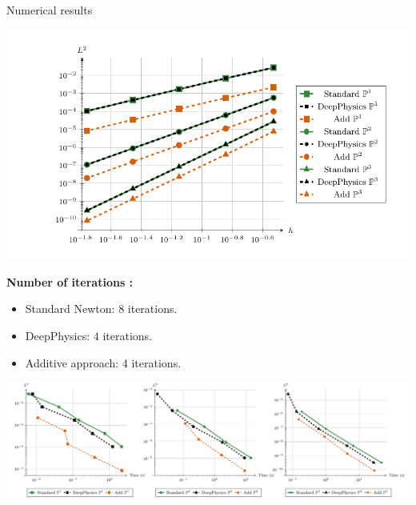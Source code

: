 \begin{frame}{Numerical results}	
    \vspace{-10pt}
    \begin{center}
        \begin{minipage}{0.58\linewidth}
            \includegraphics[width=\linewidth]{images/newlines/nonlinear/results/cvg_cropped.pdf}
        \end{minipage}
        \begin{minipage}{0.38\linewidth}
            \small
            \textbf{Number of iterations :}

            \begin{itemize}
                \item Standard Newton: $8$ iterations.
                \item DeepPhysics: $4$ iterations.
                \item Additive approach: $4$ iterations.
            \end{itemize}
        \end{minipage}
        
        \vspace{-10pt}
        \includegraphics[width=\linewidth]{images/newlines/nonlinear/results/times.pdf}
    \end{center}
\end{frame}